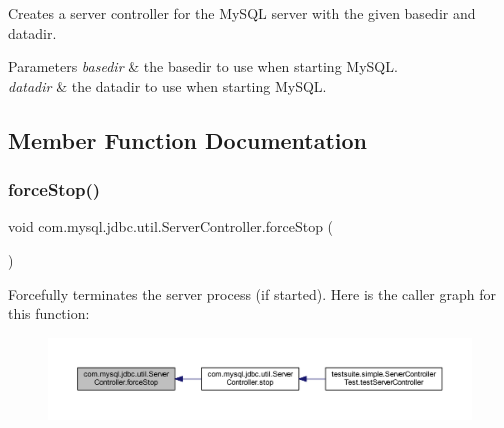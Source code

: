 Creates a server controller for the My\+S\+QL server with the given basedir and datadir.


\begin{DoxyParams}{Parameters}
{\em basedir} & the basedir to use when starting My\+S\+QL. \\
\hline
{\em datadir} & the datadir to use when starting My\+S\+QL. \\
\hline
\end{DoxyParams}


\subsection{Member Function Documentation}
\mbox{\label{classcom_1_1mysql_1_1jdbc_1_1util_1_1_server_controller_abb29f56e32e318eb294573cd0023e8f5}} 
\subsubsection{\texorpdfstring{force\+Stop()}{forceStop()}}
{\footnotesize\ttfamily void com.\+mysql.\+jdbc.\+util.\+Server\+Controller.\+force\+Stop (\begin{DoxyParamCaption}{ }\end{DoxyParamCaption})}

Forcefully terminates the server process (if started). Here is the caller graph for this function\+:
\nopagebreak
\begin{figure}[H]
\begin{center}
\leavevmode
\includegraphics[width=350pt]{classcom_1_1mysql_1_1jdbc_1_1util_1_1_server_controller_abb29f56e32e318eb294573cd0023e8f5_icgraph}
\end{center}
\end{figure}
\mbox{\label{classcom_1_1mysql_1_1jdbc_1_1util_1_1_server_controller_a2e172aa91ee196f2e0eacd651f2ae616}} 

